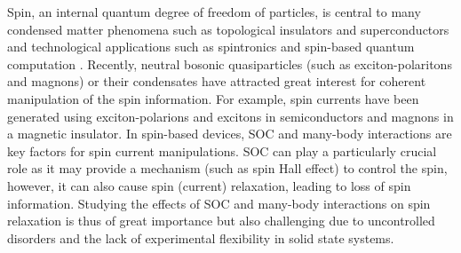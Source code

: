 \documentclass[showpacs,preprintnumbers,amsmath,amssymb, superscriptaddress, aps, reprint]{revtex4-1}
\begin{document}
{
Spin, an internal quantum degree of freedom of particles, is central to many condensed matter phenomena such as topological insulators and superconductors \cite{Hasan_TI_RevModPhys,Qi_TI_TS_RevModPhys} and technological applications such as spintronics \cite{Fundamental_Spintronics_RevModPhys2004} and spin-based quantum computation \cite{SpinQubitReview_science}. Recently, neutral bosonic quasiparticles (such as exciton-polaritons and magnons) or their condensates \cite{PolaritonBEC_RevModPhys2010, MagnonBEC_Nature2006,Physics_Of_Quantum_Fluids_2013} have attracted great interest for coherent manipulation of the spin information. For example, spin currents have been generated using exciton-polarions \cite{SpinCurrent_polariton_NPhy2007} and excitons \cite{SpinCurrent_exciton_PRL2013} in semiconductors and magnons \cite{SpinCurrent_magnon_NPhy2015,Supercurrent_magnon_NatPhy_2016} in a magnetic insulator. In spin-based devices, SOC and
many-body interactions are key factors for spin current manipulations. SOC can play a particularly crucial role as it may provide a mechanism (such as spin Hall effect) to control the spin, however, it can also cause spin (current) relaxation, leading to loss of spin information. Studying the effects of SOC and many-body interactions on spin relaxation is thus of great importance but also challenging due to uncontrolled disorders and the lack of experimental flexibility in solid state systems.

}
\end{document}
